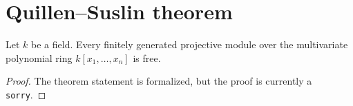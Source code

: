 \section{Quillen--Suslin theorem}

\begin{theorem}
\label{thm:quillen-suslin}
\notready
Let $k$ be a field. Every finitely generated projective module over the multivariate polynomial ring $k[x_1,\ldots,x_n]$ is free.
\end{theorem}

\begin{proof}
The theorem statement is formalized, but the proof is currently a \texttt{sorry}.
\end{proof}
